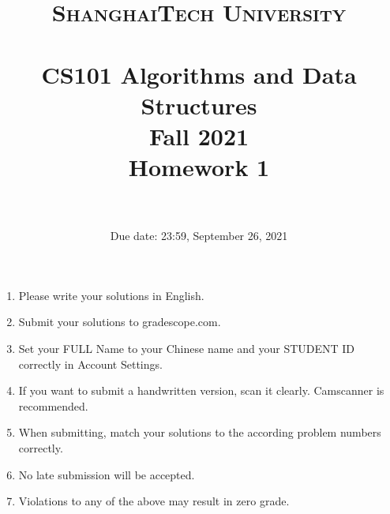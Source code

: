 \documentclass[10.5pt]{article}
\title{
	\normalfont \normalsize
	\textsc{ShanghaiTech University} \\ [25pt]
	\horrule{0.5pt} \\[0.4cm] %
	\huge CS101 Algorithms and Data Structures\\ %
	\LARGE Fall 2021\\
	\LARGE Homework 1\\
	\horrule{2pt} \\[0.5cm] %
}
\author{}
\date{Due date: 23:59, September 26, 2021}
\begin{document}
	
	\maketitle
	\thispagestyle{firstpage}
	\vspace{3ex}
	
	\begin{enumerate}
		\item Please write your solutions in English. 
		
		\item Submit your solutions to gradescope.com.  
		
		\item Set your FULL Name to your Chinese name and your STUDENT ID correctly in Account Settings. 
		
		\item If you want to submit a handwritten version, scan it clearly. Camscanner is recommended. 
		
		\item When submitting, match your solutions to the according problem numbers correctly. 
		
		\item No late submission will be accepted.
		
		\item Violations to any of the above may result in zero grade. 
	\end{enumerate}
	\newpage
	
\end{document}

